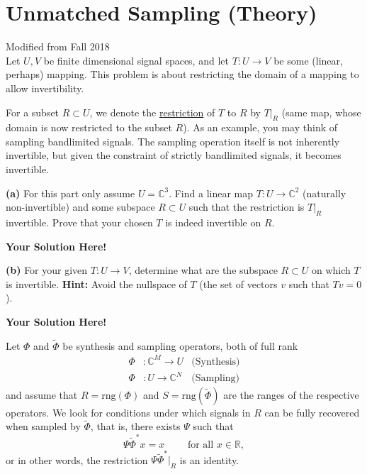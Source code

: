 \documentclass[12pt]{article}
\newcommand{\0}{\mathbf{0}}
\newcommand{\1}{\mathbf{1}}
\newcommand{\range}{\text{rng}}
\newcommand{\solspace}{\vspace{3mm} \textbf{Your Solution Here!} \vspace{3mm}}
\begin{document}
\rhead{\today}
 
\section{Unmatched Sampling (Theory)}
Modified from Fall 2018\\
Let $U,V$ be finite dimensional signal spaces, and let $T: U \rightarrow V$ be some (linear, perhaps) mapping. 
This problem is about restricting the domain of a mapping to allow invertibility.

For a subset $R \subset U$, we denote the \href{https://en.wikipedia.org/wiki/Restriction_(mathematics)}{restriction} of $T$ to $R$ by $T|_R$ (same map, whose domain is now restricted to the subset $R$).
As an example, you may think of sampling bandlimited signals. The sampling operation itself is not inherently invertible, but given the constraint of strictly bandlimited signals, it becomes invertible.

\textbf{(a)} For this part only assume $U = \mathbb{C}^3$. Find a linear map $T: U \rightarrow \mathbb{C}^2$ (naturally non-invertible) and some subspace $R \subset U$ such that the restriction is $T|_R$ invertible.
Prove that your chosen $T$ is indeed invertible on $R$.

\solspace

\textbf{(b)} For your given $T: U \rightarrow V$, determine what are the subspace $R \subset U$ on which $T$ is invertible. 
\textbf{Hint:} Avoid the nullspace of $T$ (the set of vectors $v$ such that $Tv = 0$).

\solspace

Let $\Phi$ and $\tilde \Phi$ be synthesis and sampling operators, both of full rank
\begin{align*}
    \Phi&: \mathbb{C}^M \rightarrow U  &\text{(Synthesis)} \\
    \Phi&: U \rightarrow \mathbb{C}^N  &\text{(Sampling)}
\end{align*}
and assume that $R = \range(\Phi)$ and $S = \range(\tilde \Phi)$ are the ranges of the respective operators. We look for conditions under which signals in $R$ can be fully recovered when sampled by $\tilde \Phi$, that is, there exists $\Psi$ such that
\begin{equation}
    \Psi \tilde \Phi^* x = x \qquad \text{ for all } x \in \mathbb{R},
\end{equation}
or in other words, the restriction $\Psi \tilde \Phi^*|_R$ is an identity.
\end{document}
